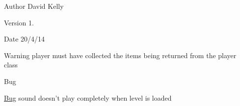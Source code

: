 \begin{DoxyAuthor}{Author}
David Kelly 
\end{DoxyAuthor}
\begin{DoxyVersion}{Version}
1. 
\end{DoxyVersion}
\begin{DoxyDate}{Date}
20/4/14
\end{DoxyDate}
\begin{DoxyWarning}{Warning}
player must have collected the items being returned from the player class
\end{DoxyWarning}
\begin{DoxyRefDesc}{Bug}
\item[\hyperlink{bug__bug000001}{Bug}]sound doesn't play completely when level is loaded \end{DoxyRefDesc}


